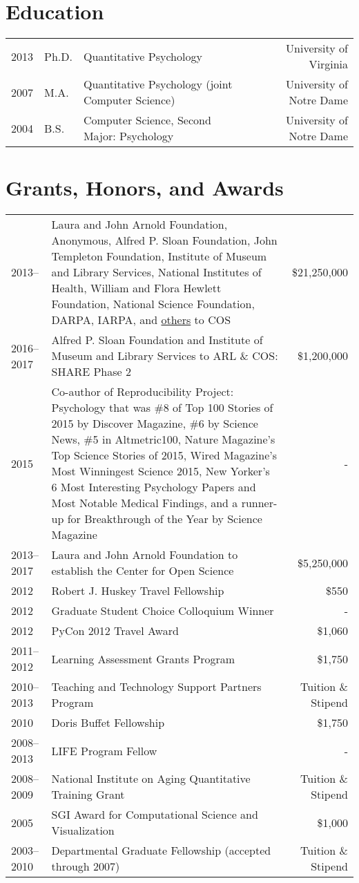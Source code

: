 \documentclass[11pt]{article}
\begin{document}
\section*{Education}
\begin{tabularx}{\textwidth}{llXr}
2013	& Ph.D.		& Quantitative Psychology                     					& University of Virginia\\
2007 	& M.A.		& Quantitative Psychology (joint Computer Science)	& University of Notre Dame\\
2004 	& B.S.		& Computer Science, Second Major: Psychology    		& University of Notre Dame\\
\end{tabularx}

\section*{Grants, Honors, and Awards}
\begin{tabularx}{\textwidth}{lXr}
2013-- 			& Laura and John Arnold Foundation, Anonymous, Alfred P. Sloan Foundation, John Templeton Foundation, Institute of Museum and Library Services, National Institutes of Health, William and Flora Hewlett Foundation, National Science Foundation, DARPA, IARPA, and \href{https://cos.io/about/our-sponsors/}{others} to COS  & \$21,250,000 \\
2016--2017		& Alfred P. Sloan Foundation and Institute of Museum and Library Services to ARL \& COS: SHARE Phase 2 & \$1,200,000 \\
2015 				& Co-author of Reproducibility Project: Psychology that was \#8 of Top 100 Stories of 2015 by Discover Magazine, \#6 by Science News, \#5 in Altmetric100, Nature Magazine’s Top Science Stories of 2015,  Wired Magazine’s Most Winningest Science 2015, New Yorker’s 6 Most Interesting Psychology Papers and Most Notable Medical Findings, and a runner-up for Breakthrough of the Year by Science Magazine & - \\
2013--2017  	& Laura and John Arnold Foundation to establish the Center for Open Science & \$5,250,000 \\
2012        		& Robert J. Huskey Travel Fellowship  & \$550 \\
2012        		& Graduate Student Choice Colloquium Winner  & - \\
2012        		& PyCon 2012 Travel Award & \$1,060\\
2011--2012  	& Learning Assessment Grants Program & \$1,750\\
2010--2013		& Teaching and Technology Support Partners Program & Tuition \& Stipend \\
2010       		& Doris Buffet Fellowship & \$1,750 \\
2008--2013 	& LIFE Program Fellow & - \\
2008--2009  	& National Institute on Aging Quantitative Training Grant & Tuition \& Stipend \\
2005 				& SGI Award for Computational Science and Visualization & \$1,000 \\
2003--2010  	& Departmental Graduate Fellowship (accepted through 2007)  & Tuition \& Stipend \\
\end{tabularx}
\end{document}
